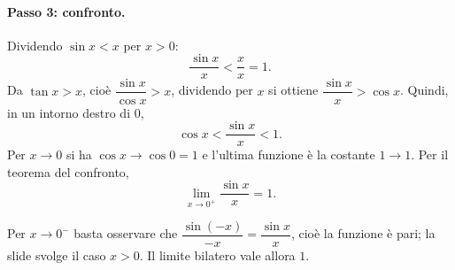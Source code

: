 \documentclass[11pt,a4paper]{article}
\begin{document}
\paragraph{Passo 3: confronto.} Dividendo $\sin x < x$ per $x > 0$:
\[
  \frac{\sin x}{x} < \frac{x}{x} = 1 .
\]
Da $\tan x > x$, cioè $\dfrac{\sin x}{\cos x} > x$, dividendo per $x$ si ottiene $\dfrac{\sin x}{x} > \cos x$. Quindi, in un intorno destro di $0$,
\[
  \cos x < \frac{\sin x}{x} < 1 .
\]
Per $x \to 0$ si ha $\cos x \to \cos 0 = 1$ e l'ultima funzione è la costante $1 \to 1$. Per il teorema del confronto,
\[
  \lim_{x\to 0^+}\frac{\sin x}{x} = 1 .
\]

\begin{osservazione}
Per $x \to 0^-$ basta osservare che $\dfrac{\sin(-x)}{-x} = \dfrac{\sin x}{x}$, cioè la funzione è pari; la slide svolge il caso $x > 0$. Il limite bilatero vale allora $1$.
\end{osservazione}
\end{document}
